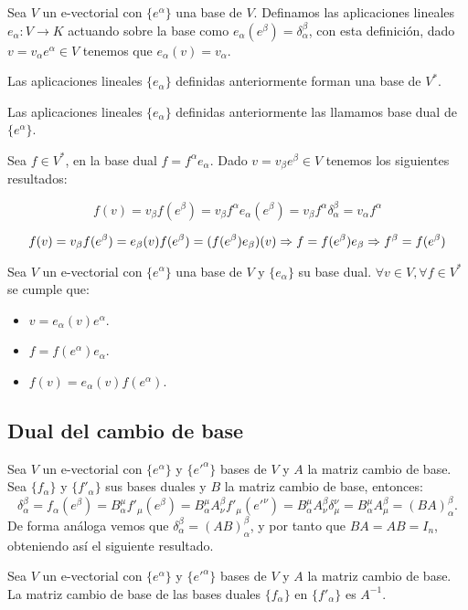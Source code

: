 Sea $V$ un e-vectorial con $\{e^\alpha\}$ una base de $V$.
Definamos las aplicaciones lineales $e_\alpha: V \longrightarrow K$ actuando sobre la base
como $e_\alpha(e^\beta)=\delta_\alpha^\beta$, con esta definición, dado $v=v_\alpha e^\alpha\in V$ tenemos
que $e_\alpha(v)=v_\alpha$.

\begin{exercise}
  Las aplicaciones lineales $\{e_\alpha\}$ definidas anteriormente forman una base de $V^*$.
\end{exercise}

\begin{definition}
  Las aplicaciones lineales $\{e_\alpha\}$ definidas anteriormente las llamamos base dual de $\{e^\alpha\}$.
\end{definition}

Sea $f\in V^*$, en la base dual $f=f^\alpha e_\alpha$.
Dado $v=v_\beta e^\beta\in V$ tenemos los siguientes resultados:

\begin{equation*}
  f(v)=v_\beta f(e^\beta)=v_\beta f^\alpha e_\alpha(e^\beta)=
  v_\beta f^\alpha \delta_\alpha^\beta=v_\alpha f^\alpha
\end{equation*}

\begin{equation*}
  f(v)=v_\beta f(e^\beta)=e_\beta(v)f(e^\beta)=(f(e^\beta) e_\beta)(v)\Rightarrow f=f(e^\beta) e_\beta\Rightarrow f^\beta=f(e^\beta)
\end{equation*}

\begin{proposition}
  \label{res:coordenadas_duales}
  Sea $V$ un e-vectorial con $\{e^\alpha\}$ una base de $V$ y $\{e_\alpha\}$ su base dual.
  $\forall v\in V, \forall f\in V^*$ se cumple que:
  \begin{itemize}
    \item $v=e_\alpha(v)e^\alpha$.
    \item $f=f(e^\alpha)e_\alpha$.
    \item $f(v)=e_\alpha(v)f(e^\alpha)$.
  \end{itemize}
\end{proposition}


\subsection{Dual del cambio de base}\label{sec:dual-del-cambio-de-base}
Sea $V$ un e-vectorial con $\{e^\alpha\}$ y $\{e'^\alpha\}$ bases de $V$ y $A$ la matriz cambio de base.
Sea $\{f_\alpha\}$ y $\{f'_\alpha\}$ sus bases duales y $B$ la matriz cambio de base, entonces:
\[
  \delta_\alpha^\beta=f_\alpha(e^\beta)=B_\alpha^\mu f'_\mu(e^\beta)=B_\alpha^\mu A^\beta_\nu f'_\mu(e'^\nu)=B_\alpha^\mu A^\beta_\nu\delta^\nu_\mu=B_\alpha^\mu A^\beta_\mu=(BA)^\beta_\alpha.
\]
De forma análoga vemos que $\delta^\beta_\alpha=(AB)^\beta_\alpha$, y por tanto que $BA=AB=I_n$, obteniendo así el siguiente resultado.

\begin{proposition}
  \label{res:dual_cambio_base}
  Sea $V$ un e-vectorial con $\{e^\alpha\}$ y $\{e'^\alpha\}$ bases de $V$ y $A$ la matriz cambio de base.
  La matriz cambio de base de las bases duales $\{f_\alpha\}$ en $\{f'_\alpha\}$ es $A^{-1}$.

\end{proposition}
